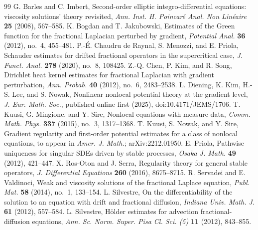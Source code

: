 \documentclass[10pt,a4paper]{amsart}
\numberwithin{equation}{section}
\begin{document}
\begin{thebibliography}{99}
 G. Barles and C. Imbert, Second-order elliptic integro-differential equations: viscosity solutions' theory revisited, \emph{Ann. Inst. H. Poincar\'e Anal. Non Lin\'eaire} \textbf{25} (2008), 567--585.
 K. Bogdan and T. Jakubowski, Estimates of the Green function for the fractional Laplacian perturbed by gradient, \emph{Potential Anal.} \textbf{36} (2012), no.~4, 455--481.
 P.-\'E. Chaudru de Raynal, S. Menozzi, and E. Priola, Schauder estimates for drifted fractional operators in the supercritical case, \emph{J. Funct. Anal.} \textbf{278} (2020), no.~8, 108425.
 Z.-Q. Chen, P. Kim, and R. Song, Dirichlet heat kernel estimates for fractional Laplacian with gradient perturbation, \emph{Ann. Probab.} \textbf{40} (2012), no.~6, 2483--2538.
 L. Diening, K. Kim, H.-S. Lee, and S. Nowak, Nonlinear nonlocal potential theory at the gradient level, \emph{J. Eur. Math. Soc.}, published online first (2025), doi:10.4171/JEMS/1706.
 T. Kuusi, G. Mingione, and Y. Sire, Nonlocal equations with measure data, \emph{Comm. Math. Phys.} \textbf{337} (2015), no.~3, 1317--1368.
 T. Kuusi, S. Nowak, and Y. Sire, Gradient regularity and first-order potential estimates for a class of nonlocal equations, to appear in \emph{Amer. J. Math.}; arXiv:2212.01950.
 E. Priola, Pathwise uniqueness for singular SDEs driven by stable processes, \emph{Osaka J. Math.} \textbf{49} (2012), 421--447.
 X. Ros-Oton and J. Serra, Regularity theory for general stable operators, \emph{J. Differential Equations} \textbf{260} (2016), 8675--8715.
 R. Servadei and E. Valdinoci, Weak and viscosity solutions of the fractional Laplace equation, \emph{Publ. Mat.} \textbf{58} (2014), no.~1, 133--154.
 L. Silvestre, On the differentiability of the solution to an equation with drift and fractional diffusion, \emph{Indiana Univ. Math. J.} \textbf{61} (2012), 557--584.
 L. Silvestre, H\"older estimates for advection fractional-diffusion equations, \emph{Ann. Sc. Norm. Super. Pisa Cl. Sci. (5)} \textbf{11} (2012), 843--855.
\end{thebibliography}
\end{document}
